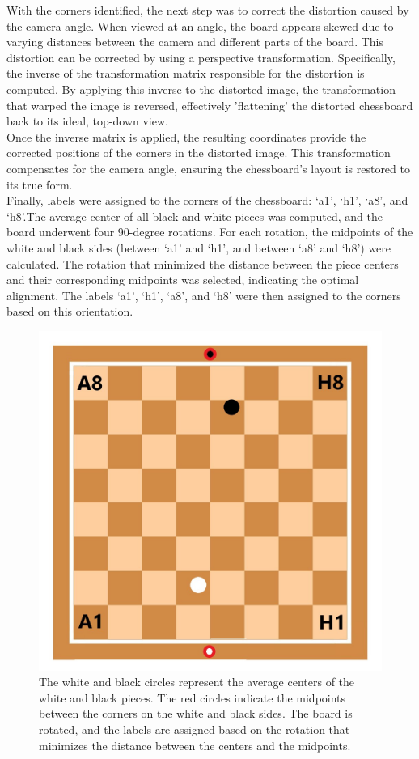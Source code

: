 With the corners identified, the next step was to correct the distortion caused by the camera angle. When viewed at an angle, the board appears skewed due to varying distances between the camera and different parts of the board. This distortion can be corrected by using a perspective transformation. Specifically, the inverse of the transformation matrix responsible for the distortion is computed. By applying this inverse to the distorted image, the transformation that warped the image is reversed, effectively 'flattening' the distorted chessboard back to its ideal, top-down view. \\ 

Once the inverse matrix is applied, the resulting coordinates provide the corrected positions of the corners in the distorted image. This transformation compensates for the camera angle, ensuring the chessboard’s layout is restored to its true form. \\

Finally, labels were assigned to the corners of the chessboard: ‘a1’, ‘h1’, ‘a8’, and ‘h8’.The average center of all black and white pieces was computed, and the board underwent four 90-degree rotations. For each rotation, the midpoints of the white and black sides (between ‘a1’ and ‘h1’, and between ‘a8’ and ‘h8’) were calculated. The rotation that minimized the distance between the piece centers and their corresponding midpoints was selected, indicating the optimal alignment. The labels ‘a1’, ‘h1’, ‘a8’, and ‘h8’ were then assigned to the corners based on this orientation.
 
\newpage

\begin{figure}[h!]
\centering
\includegraphics[width=0.75\linewidth]{figures/methods/ml-models/label_assignment_board.jpg}
\caption[S]{The white and black circles represent the average centers of the white and black pieces. The red circles indicate the midpoints between the corners on the white and black sides. The board is rotated, and the labels are assigned based on the rotation that minimizes the distance between the centers and the midpoints.}
\label{fig:board_label_assignment}
\end{figure}


